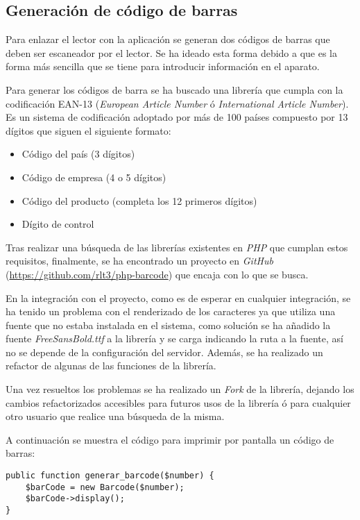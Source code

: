 \subsection{Generación de código de barras}

Para enlazar el lector con la aplicación se generan dos códigos de barras que deben ser escaneador por el lector. Se ha ideado esta forma debido a que es la forma más sencilla que se tiene para introducir información en el aparato.

Para generar los códigos de barra se ha buscado una librería que cumpla con la codificación EAN-13 (\emph{European Article Number} ó \emph{International Article Number}). Es un sistema de codificación adoptado por más de 100 países compuesto por 13 dígitos que siguen el siguiente formato:

    \begin{itemize}
        \item Código del país (3 dígitos)
        \item Código de empresa (4 o 5 dígitos)
        \item Código del producto (completa los 12 primeros dígitos)
        \item Dígito de control
    \end{itemize}

Tras realizar una búsqueda de las librerías existentes en \emph{PHP} que cumplan estos requisitos, finalmente, se ha encontrado un proyecto en \emph{GitHub} (\url{https://github.com/rlt3/php-barcode}) que encaja con lo que se busca.

En la integración con el proyecto, como es de esperar en cualquier integración, se ha tenido un problema con el renderizado de los caracteres ya que utiliza una fuente que no estaba instalada en el sistema, como solución se ha añadido la fuente \emph{FreeSansBold.ttf} a la librería y se carga indicando la ruta a la fuente, así no se depende de la configuración del servidor. Además, se ha realizado un refactor de algunas de las funciones de la librería.

Una vez resueltos los problemas se ha realizado un \emph{Fork} de la librería, dejando los cambios refactorizados accesibles para futuros usos de la librería ó para cualquier otro usuario que realice una búsqueda de la misma.

A continuación se muestra el código para imprimir por pantalla un código de barras:

    \begin{lstlisting}
public function generar_barcode($number) {
    $barCode = new Barcode($number);
    $barCode->display();
}
    \end{lstlisting}